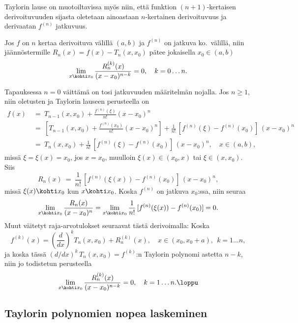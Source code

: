 Taylorin lause on muotoiltavissa myös niin, että funktion $(n+1)$-kertaisen derivoituvuuden
sijasta oletetaan ainoastaan $n$-kertainen derivoituvuus ja derivaatan $f^{(n)}$ jatkuvuus.
\begin{Lause} \label{Taylorin approksimaatiolause} Jos $f$ on $n$ kertaa derivoituva välillä
$(a,b)$ ja $f^{(n)}$ on jatkuva ko.\ välillä, niin jäännöstermille $R_n(x)=f(x)-T_n(x,x_0)$
pätee jokaisella $x_0\in(a,b)$
\[
\lim_{x \kohti x_0} \frac{R_n^{(k)}(x)}{(x-x_0)^{n-k}} = 0, \quad k = 0 \ldots n.
\]
\end{Lause}
\tod Tapauksessa $n=0$ väittämä on tosi jatkuvuuden määritelmän nojalla. Jos $n \ge 1$, niin 
oletusten ja Taylorin lauseen perusteella on
\begin{align*}
f(x)\ &=\ T_{n-1}(x,x_0) + \frac{f^{(n)}(\xi)}{n!}(x-x_0)^n \\
      &=\ \left[T_{n-1}(x,x_0) + \frac{f^{(n)}(x_0)}{n!}(x-x_0)^n\right] 
                               + \frac{1}{n!}\,[f^{(n)}(\xi)-f^{(n)}(x_0)]\,(x-x_0)^n \\
      &=\ T_n(x,x_0) + \frac{1}{n!}\,[f^{(n)}(\xi)-f^{(n)}(x_0)]\,(x-x_0)^n, \quad x\in(a,b),
\end{align*} 
missä $\xi=\xi(x)=x_0$, jos $x=x_0$, muulloin $\xi(x)\in(x_0,x)$ tai $\xi\in(x,x_0)$. Siis
\[
R_n(x)\ =\  \frac{1}{n!}\,[f^{(n)}(\xi(x))-f^{(n)}(x_0)]\,(x-x_0)^n,
\]
missä $\xi(x) \kohti x_0$ kun $x \kohti x_0$. Koska $f^{(n)}$ on jatkuva $x_0$:ssa, niin
seuraa
 \[
\lim_{x \kohti x_0} \frac{R_n(x)}{(x-x_0)^n} 
              = \lim_{x \kohti x_0} \frac{1}{n!}\,[f^{(n)}(\xi(x))-f^{(n)}(x_0)] = 0.
\]
Muut väitetyt raja-arvotulokset seuraavat tästä derivoimalla: Koska
\[
f^{(k)}(x) = \left(\frac{d}{dx}\right)^k T_n(x,x_0) + R_n^{(k)}(x), \quad 
                                  x \in (x_0,x_0+a),\ \ k=1 \ldots n,
\]
ja koska tässä $(d/dx)^k\,T_n(x,x_0) = f^{(k)}$:n Taylorin polynomi astetta $n-k$, niin jo 
todistetun perusteella
\[
\lim_{x \kohti x_0} \frac{R_n^{(k)}(x)}{(x-x_0)^{n-k}} = 0, \quad k=1 \ldots n. \loppu
\]

\subsection{Taylorin polynomien nopea laskeminen}

